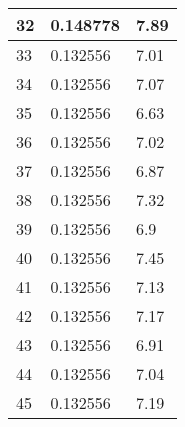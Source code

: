 \begin{table}
\begin{tabular}{ | l | l | l |}
    32 & 0.148778 & 7.89 \\ \hline
    33 & 0.132556 & 7.01 \\ \hline
    34 & 0.132556 & 7.07 \\ \hline
    35 & 0.132556 & 6.63 \\ \hline
    36 & 0.132556 & 7.02 \\ \hline
    37 & 0.132556 & 6.87 \\ \hline
    38 & 0.132556 & 7.32 \\ \hline 
    39 & 0.132556 & 6.9 \\ \hline
    40 & 0.132556 & 7.45 \\ \hline
    41 & 0.132556 & 7.13 \\ \hline
    42 & 0.132556 & 7.17 \\ \hline
    43 & 0.132556 & 6.91 \\ \hline
    44 & 0.132556 & 7.04 \\ \hline
    45 & 0.132556 & 7.19 \\ \hline
    \end{tabular}
\label{table:CPU first test}
\end{table}
\bigskip

